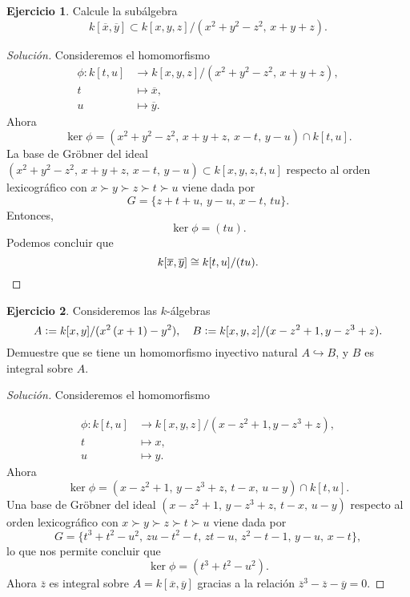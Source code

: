 \documentclass{article}
\theoremstyle{definition}
\newtheorem{ejerc}{Ejercicio}
\newenvironment{solucion}{\begin{proof}[Solución]}{\end{proof}}
\begin{document}
\begin{ejerc}
  Calcule la subálgebra
  $$k [\overline{x},\overline{y}] \subset k[x,y,z]/(x^2+y^2-z^2, \, x+y+z).$$

  \ifdefined\solutions\begin{solucion} Consideremos el homomorfismo
    \begin{align*}
      \phi\colon k [t,u] & \to k[x,y,z]/(x^2+y^2-z^2, \, x+y+z),\\
      t & \mapsto \overline{x},\\
      u & \mapsto \overline{y}.
    \end{align*}
    Ahora
    $$\ker \phi = (x^2+y^2-z^2, \, x+y+z, \, x-t, \, y-u) \cap k [t,u].$$
    La base de Gröbner del ideal
    $(x^2+y^2-z^2, \, x+y+z, \, x-t, \, y-u) \subset k [x,y,z,t,u]$ respecto al
    orden lexicográfico con $x \succ y \succ z \succ t \succ u$ viene dada por
    $$G = \{ z+t+u, \, y-u, \, x-t, \, tu \}.$$
    Entonces,
    $$\ker \phi = (tu).$$
    Podemos concluir que
    \[ k [\overline{x},\overline{y}] \cong k [t,u]/(tu). \qedhere \]
  \end{solucion}\fi
\end{ejerc}

\begin{ejerc}
  Consideremos las $k$-álgebras
  $$A \mathrel{\mathop:}= k [x,y]/(x^2\,(x+1)-y^2), \quad B \mathrel{\mathop:}= k[x,y,z]/(x-z^2+1, y-z^3+z).$$
  Demuestre que se tiene un homomorfismo inyectivo natural
  $A \hookrightarrow B$, y $B$ es integral sobre $A$.

  \ifdefined\solutions\begin{solucion}
    Consideremos el homomorfismo

    \begin{align*}
      \phi\colon k [t,u] & \to k[x,y,z]/(x-z^2+1, y-z^3+z),\\
      t & \mapsto x,\\
      u & \mapsto y.
    \end{align*}
    Ahora
    $$\ker \phi = (x-z^2+1, \, y-z^3+z, \, t-x, \, u-y) \cap k [t,u].$$
    Una base de Gröbner del ideal $(x-z^2+1, \, y-z^3+z, \, t-x, \, u-y)$
    respecto al orden lexicográfico con $x \succ y \succ z \succ t \succ u$
    viene dada por
    $$G = \{ t^3+t^2-u^2, \, zu-t^2-t, \, zt-u, \, z^2-t-1, \, y-u, \, x-t \},$$
    lo que nos permite concluir que
    $$\ker \phi = (t^3+t^2-u^2).$$
    Ahora $\overline{z}$ es integral sobre $A = k [\overline{x},\overline{y}]$
    gracias a la relación $\overline{z}^3 - \overline{z} - \overline{y} = 0$.
  \end{solucion}\fi
\end{ejerc}
\end{document}
